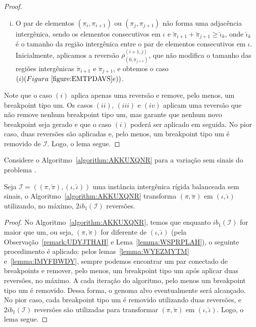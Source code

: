 \begin{proof}
\begin{enumerate}[i.]
    \item O par de elementos $(\pi_{i},\pi_{i+1})$ ou $(\pi_{j},\pi_{j+1})$ não forma uma adjacência intergênica, sendo os elementos consecutivos em $\iota$ e $\breve\pi_{i+1} + \breve\pi_{j+1} \ge \breve\iota_k$, onde $\breve\iota_k$ é o tamanho da região intergênica entre o par de elementos consecutivos em $\iota$. Inicialmente, aplicamos a reversão $\rho^{(i+1, j)}_{(0,\breve\pi_{j+1})}$, que não modifica o tamanho das regiões intergênicas $\breve\pi_{i+1}$ e $\breve\pi_{j+1}$, e obtemos o caso $(i) (Figura~\ref{figure:EMTPDAVS}e))$.
\end{enumerate}
Note que o caso $(i)$ aplica apenas uma reversão e remove, pelo menos, um breakpoint tipo um. Os casos $(ii)$, $(iii)$ e $(iv)$ aplicam uma reversão que não remove nenhum breakpoint tipo um, mas garante que nenhum novo breakpoint seja gerado e que o caso $(i)$ poderá ser aplicado em seguida. No pior caso, duas reversões são aplicadas e, pelo menos, um breakpoint tipo um é removido de $\mathcal{I}$. Logo, o lema segue. 
\end{proof}



Considere o Algoritmo~\ref{algorithm:AKKUXQNR} para a variação sem sinais do problema \SbIR{}.  



\begin{lemma}\label{lemma:RBHACFIP}
Seja $\mathcal{I}=((\pi,\breve\pi),(\iota,\breve\iota))$ uma instância intergênica rígida balanceada sem sinais, o Algoritmo~\ref{algorithm:AKKUXQNR} transforma $(\pi,\breve\pi)$ em $(\iota,\breve\iota)$ utilizando, no máximo, $2ib_1(\mathcal{I})$ reversões.
\end{lemma}
\begin{proof}
  No Algoritmo~\ref{algorithm:AKKUXQNR}, temos que enquanto $ib_1(\mathcal{I})$ for maior que um, ou seja, $(\pi,\breve\pi)$ for diferente de $(\iota,\breve\iota)$ (pela Observação~\ref{remark:UDYJTHAH} e Lema~\ref{lemma:WSPRPLAH}), o seguinte procedimento é aplicado: pelos lemas~\ref{lemma:WYEZMYTM} e~\ref{lemma:IMYFBWDY}, sempre podemos encontrar um par conectado de breakpoints e remover, pelo menos, um breakpoint tipo um após aplicar duas reversões, no máximo. A cada iteração do algoritmo, pelo menos um breakpoint tipo um é removido. Dessa forma, o genoma alvo eventualmente será alcançado. No pior caso, cada breakpoint tipo um é removido utilizando duas reversões, e $2ib_1(\mathcal{I})$ reversões são utilizadas para transformar $(\pi,\breve\pi)$ em $(\iota,\breve\iota)$. Logo, o lema segue.
\end{proof}

